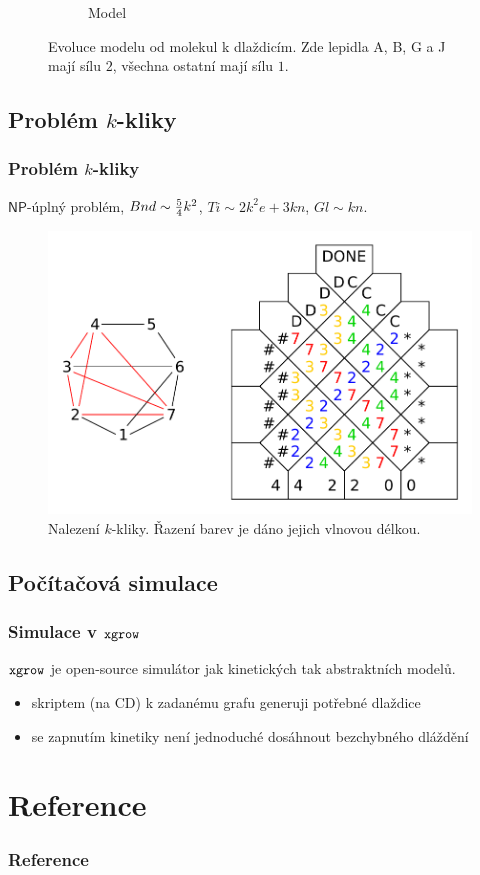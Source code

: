 \documentclass[10pt]{beamer}
\newcommand{\NP}{\mathsf{NP}}
\theoremstyle{definition}
\theoremstyle{remark}
\begin{document}
\begin{frame}
\begin{figure}[H]
\begin{center}
\begin{subfigure}[b]{0.25\textwidth}
			\caption{Model}
		\end{subfigure}
		\caption{Evoluce modelu od molekul k dlaždicím. Zde lepidla {\sf A}, {\sf B}, {\sf G} a {\sf J} mají sílu $2$, všechna ostatní mají sílu $1$.}
		\label{fig:evolution}
	\end{center}
	\end{figure}
\end{frame}

\subsection{Problém $k$-kliky}
\begin{frame}
\frametitle{Problém $k$-kliky}
	$\NP$-úplný problém, $Bnd \sim \nicefrac{5}{4}k^2$, $Ti \sim 2k^2e + 3kn$, $Gl \sim kn$.
	\begin{figure}[h]
	\begin{center}
		\includegraphics[scale=0.6]{../figures/k-clique/k-clique.pdf}
		\caption{Nalezení $k$-kliky. Řazení barev je dáno jejich vlnovou délkou.}
	\end{center}
	\end{figure}
\end{frame}

\subsection{Počítačová simulace}
\begin{frame}
\frametitle{Simulace v $\tt xgrow$}
	$\tt xgrow$ je open-source simulátor jak kinetických tak abstraktních modelů.
	\begin{itemize}
		\item skriptem (na CD) k zadanému grafu generuji potřebné dlaždice
		\item se zapnutím kinetiky není jednoduché dosáhnout bezchybného dláždění
	\end{itemize}
\end{frame}

\section*{Reference}
\begin{frame}[allowframebreaks=0.95]
\frametitle{Reference}
	{}
	
\end{frame}
\end{document}
